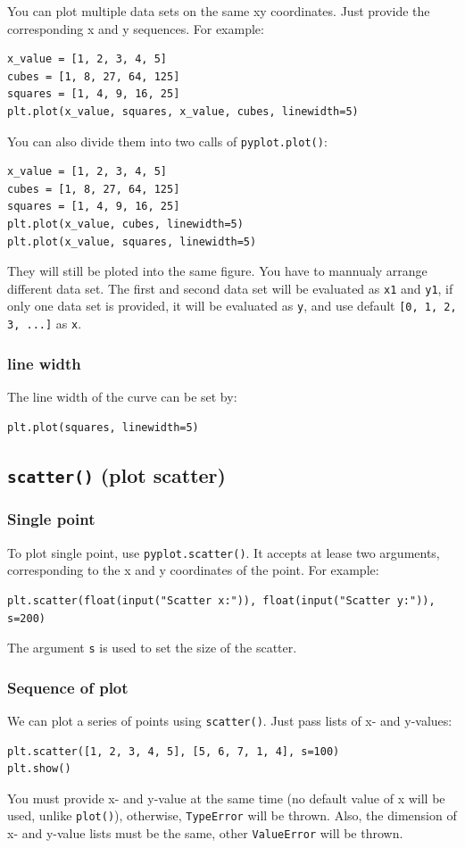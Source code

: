 \documentclass[12pt]{book}
\begin{document}
You can plot multiple data sets on the same xy coordinates. Just provide the corresponding x and y sequences. For example:
\begin{verbatim}
x_value = [1, 2, 3, 4, 5]
cubes = [1, 8, 27, 64, 125]
squares = [1, 4, 9, 16, 25]
plt.plot(x_value, squares, x_value, cubes, linewidth=5)
\end{verbatim}

You can also divide them into two calls of \texttt{pyplot.plot()}:
\begin{verbatim}
x_value = [1, 2, 3, 4, 5]
cubes = [1, 8, 27, 64, 125]
squares = [1, 4, 9, 16, 25]
plt.plot(x_value, cubes, linewidth=5)
plt.plot(x_value, squares, linewidth=5)
\end{verbatim}
They will still be ploted into the same figure. You have to mannualy arrange different data set. The first and second data set will be evaluated as \texttt{x1} and \texttt{y1}, if only one data set is provided, it will be evaluated as \texttt{y}, and use default \texttt{[0, 1, 2, 3, ...]} as \texttt{x}.
\subsubsection{line width}
\label{sec:orgc4f18f5}
The line width of the curve can be set by:
\begin{verbatim}
plt.plot(squares, linewidth=5)
\end{verbatim}

\subsection{\texttt{scatter()} (plot scatter)}
\label{sec:orga36ae10}
\subsubsection{Single point}
\label{sec:org55cde12}
To plot single point, use \texttt{pyplot.scatter()}. It accepts at lease two arguments, corresponding to the x and y coordinates of the point. For example:
\begin{verbatim}
plt.scatter(float(input("Scatter x:")), float(input("Scatter y:")), s=200)
\end{verbatim}
The argument \texttt{s} is used to set the size of the scatter.
\subsubsection{Sequence of plot}
\label{sec:org5fbe9c0}
We can plot a series of points using \texttt{scatter()}. Just pass lists of x- and y-values:
\begin{verbatim}
plt.scatter([1, 2, 3, 4, 5], [5, 6, 7, 1, 4], s=100)
plt.show()
\end{verbatim}
You must provide x- and y-value at the same time (no default value of x will be used, unlike \texttt{plot()}), otherwise, \texttt{TypeError} will be thrown. Also, the dimension of x- and y-value lists must be the same, other \texttt{ValueError} will be thrown.
\end{document}
